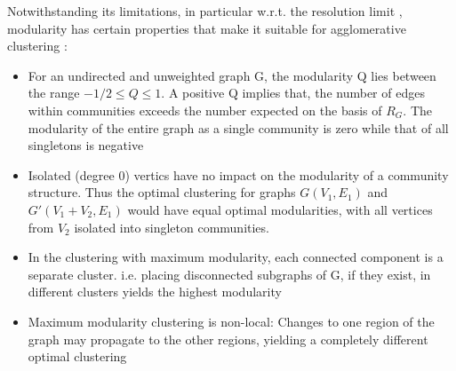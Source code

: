 \documentclass[conference]{IEEEtran}
\begin{document}
Notwithstanding its limitations, in particular w.r.t. the resolution 
limit \cite{for2}, modularity has certain properties that make it suitable for 
agglomerative clustering \cite{for, bran}:
\begin{itemize}
 \item For an undirected and unweighted graph G, the modularity Q lies between
the range $-1/2 \leqslant Q \leqslant 1$. A positive Q implies that, the
number of edges within communities exceeds the number expected on the basis of
$R_G$. The modularity of the entire graph as a single community is zero while
that of all singletons is negative
\item Isolated (degree 0) vertics have no impact on the modularity of a
community structure. Thus the optimal clustering for graphs $G(V_1, E_1)$ and 
$G'(V_1+V_2, E_1)$ would have equal optimal modularities, with all vertices 
from $V_2$ isolated into singleton communities.
\item In the clustering with maximum modularity, each connected component is a 
separate cluster. i.e. placing disconnected subgraphs of G, if they exist, in 
different clusters yields the highest modularity
\item Maximum modularity clustering is non-local: Changes to one 
region of the graph may propagate to the other regions, yielding a completely 
different optimal clustering
\end{itemize}
\end{document}
